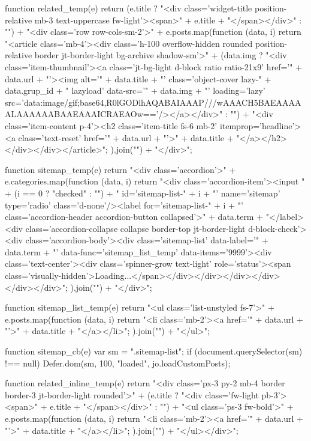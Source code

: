 {{{{function related_temp(e) {
  return (e.title ? "<div class='widget-title position-relative  mb-3 text-uppercase fw-light'><span>" + e.title + "</span></div>" : "") + "<div class='row row-cols-sm-2'>" + e.posts.map(function (data, i) {
    return "<article class='mb-4'><div class='h-100 overflow-hidden rounded position-relative border jt-border-light bg-archive shadow-sm'>" + (data.img ? "<div class='item-thumbnail'><a class='jt-bg-light d-block ratio ratio-21x9' href='" + data.url + "'><img alt='" + data.title + "' class='object-cover lazy-" + data.grup_id + " lazyload' data-src='" + data.img + "' loading='lazy' src='data:image/gif;base64,R0lGODlhAQABAIAAAP///wAAACH5BAEAAAAALAAAAAABAAEAAAICRAEAOw=='/></a></div>" : "") + "<div class='item-content p-4'><h2 class='item-title fs-6 mb-2' itemprop='headline'><a class='text-reset' href='" + data.url + "'>" + data.title + "</a></h2></div></div></article>";
  }).join("") + "</div>";
}

function sitemap_temp(e) {
  return "<div class='accordion'>" + e.categories.map(function (data, i) {
    return "<div class='accordion-item'><input " + (i == 0 ? "checked" : "") + " id='sitemap-list-" + i + "' name='sitemap' type='radio' class='d-none'/><label for='sitemap-list-" + i + "' class='accordion-header accordion-button collapsed'>" + data.term + "</label><div class='accordion-collapse collapse border-top jt-border-light d-block-check'><div class='accordion-body'><div class='sitemap-list' data-label='" + data.term + "' data-func='sitemap_list_temp' data-items='9999'><div class='text-center'><div class='spinner-grow text-light' role='status'><span class='visually-hidden'>Loading...</span></div></div></div></div></div></div>";
  }).join("") + "</div>";
}

function sitemap_list_temp(e) {
  return "<ul class='list-unstyled fs-7'>" + e.posts.map(function (data, i) {
    return "<li class='mb-2'><a href='" + data.url + "'>" + data.title + "</a></li>";
  }).join("") + "</ul>";
}

function sitemap_cb(e) {
  var sm = ".sitemap-list";
  if (document.querySelector(sm) !== null) {
    Defer.dom(sm, 100, "loaded", jo.loadCustomPosts);
  }
}

function related_inline_temp(e) {
  return "<div class='px-3 py-2 mb-4 border border-3 jt-border-light rounded'>" + (e.title ? "<div class='fw-light pb-3'><span>" + e.title + "</span></div>" : "") + "<ul class='ps-3 fw-bold'>" + e.posts.map(function (data, i) {
    return "<li class='mb-2'><a href='" + data.url + "'>" + data.title + "</a></li>";
  }).join("") + "</ul></div>";
}

}}}}

